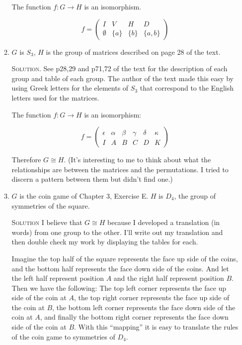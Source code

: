 \documentclass[twoside]{amsart}
\newcommand{\solution}{\textsc{Solution}\xspace}
\newcommand{\iso}{\cong}
\newcommand{\blank}{\vspace{5pt}}
\begin{document}
\begin{enumerate}[A.]
\begin{enumerate}[1]
		The function $f : G \to H$ is an isomorphism.

		\begin{center}
		\[
		   f = \begin{pmatrix}
				 	I & V & H & D \\
					\emptyset & \{a\} & \{b\} & \{a,b\}
			    \end{pmatrix}
		\]
		\end{center}

		\item $G$ is $S_3$, $H$ is the group of matrices described on page 28
		of the text.

		\blank \noindent \solution. See p28,29 and p71,72 of the text for the
		description of each group and table of each group. The author of the
		text made this easy by using Greek letters for the elements of
		$S_3$ that correspond to the English letters used for the matrices.

		The function $f : G \to H$ is an isomorphism:

		\begin{center}
		\[
			f =	\begin{pmatrix}
						\epsilon & \alpha & \beta & \gamma & \delta & \kappa \\
						I        & A      & B     & C      & D      & K
				 	\end{pmatrix}
		\]
		\end{center}

		Therefore $G \iso H$. (It's interesting to me to think about what
		the relationships are between the matrices and the permutations.
		I tried to discern a pattern between them but didn't find one.)

		\blank
		\item $G$ is the coin game of Chapter 3, Exercise E. $H$ is $D_4$,
		the group of symmetries of the square.

		\blank \noindent \solution I believe that $G \iso H$ because I
		developed a translation (in words) from one group to the other.
		I'll write out my translation and then double check my work
		by displaying the tables for each.

		Imagine the top half of the square represents the face up side
		of the coins, and the bottom half represents the face down side
		of the coins. And let the left half represent position $A$ and
		the right half represent position $B$. Then we have the following:
		The top left corner represents the face up side of the coin at $A$, the
		top right corner represents the face up side of the coin at $B$,
		the bottom left corner represents the face down side of the coin at $A$,
		and finally the bottom right corner represents the face down side
		of the coin at $B$. With this ``mapping'' it is easy to translate
		the rules of the coin game to symmetries of $D_4$.


\end{enumerate}
\end{enumerate}
\end{document}
